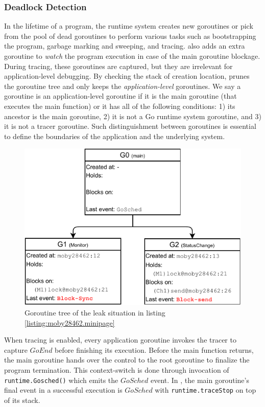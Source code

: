 \subsubsection{Deadlock Detection}
In the lifetime of a program, the runtime system creates new goroutines or pick from the pool of dead goroutines to perform various tasks such as bootstrapping the program, garbage marking and sweeping, and tracing.
%
\goat also adds an extra goroutine to \textit{watch} the program execution in case of the main goroutine blockage.
%
During tracing, these goroutines are captured, but they are irrelevant for application-level debugging.
%
By checking the stack of creation location, \goat prunes the goroutine tree and only keeps the \textit{application-level} goroutines.
%
We say a goroutine is an application-level goroutine if it is the main goroutine (that executes the main function) or it has all of the following conditions:
1) its ancestor is the main goroutine,
2) it is not a Go runtime system goroutine, and
3) it is not a tracer goroutine.
Such distinguishment between goroutines is essential to define the boundaries of the application and the underlying system.

\begin{figure}[]
\centering
\includegraphics[width=0.75\linewidth]{figs/gtree.pdf}
\caption{Goroutine tree of the leak situation in listing \ref{listing:moby28462.minipage}}
\label{fig:gtree}
\end{figure}

When tracing is enabled, every application goroutine invokes the tracer to capture $GoEnd$ before finishing its execution.
%
Before the main function returns, the main goroutine hands over the control to the root goroutine to finalize the program termination.
%
This context-switch is done through invocation of \texttt{runtime.Gosched()} which emits the $GoSched$ event.
%
In \goat, the main goroutine's final event in a successful execution is $GoSched$ with \texttt{runtime.traceStop} on top of its stack.
%

